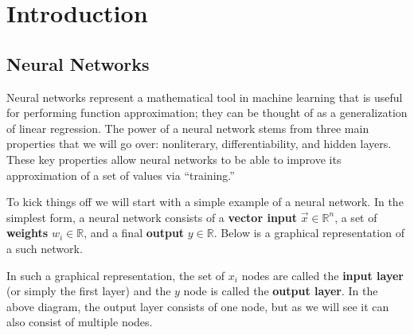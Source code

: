 \documentclass[12pt,letterpaper]{book}
\theoremstyle{definition}
\begin{document}
 
  \chapter{Introduction}
  \section{Neural Networks}
  Neural networks represent a mathematical tool in machine learning that is useful for performing function 
  approximation; they can be thought of as a generalization of linear regression. The power of a neural network stems 
  from three main properties that we will go over: nonliterary, differentiability, and hidden layers.
  These key properties allow neural networks to be able to improve its approximation of a set of values via ``training.'' 

  To kick things off we will start with a simple example of a neural network.
  In the simplest form, a neural network consists of a \textbf{vector input} $\vec{x} \in \mathbb{R}^n$, a set 
  of \textbf{weights} $w_i \in \mathbb{R}$, and a final \textbf{output} $y \in \mathbb{R}$.
  Below is a graphical representation of a such network. 

  \begin{center}

  \end{center}
  In such a graphical representation, the set of $x_i$ nodes are called the \textbf{input layer} (or simply the first layer)
  and the $y$ node is called the \textbf{output layer}. In the above diagram, the output layer 
  consists of one node, but as we will see it can also consist of multiple nodes.
\end{document}
